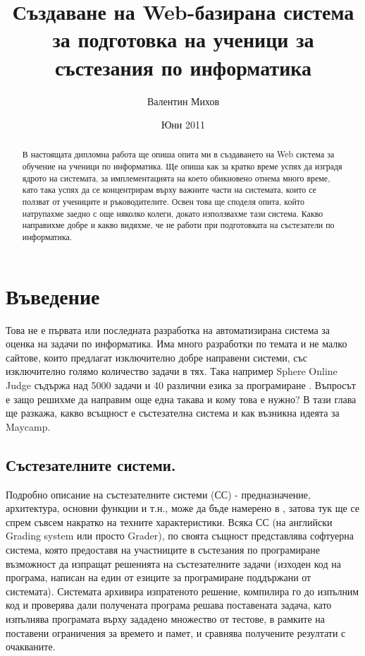 \documentclass[a4paper,12pt]{article}
\begin{document}
  \title{Създаване на Web-базирана система за подготовка на ученици за състезания по информатика}
  \author{Валентин Михов}
  \date{Юни 2011}
  
  \maketitle
  
  \begin{abstract}
    
    В настоящата дипломна работа ще опиша опита ми в създаването на Web система за обучение на ученици по информатика. Ще опиша как за кратко време успях да изградя ядрото на системата, за имплементацията на което обикновено отнема много време, като така успях да се концентрирам върху важните части на системата, които се ползват от учениците и ръководителите. Освен това ще споделя опита, който натрупахме заедно с още няколко колеги, докато използвахме тази система. Какво направихме добре и какво видяхме, че не работи при подготовката на състезатели по информатика.
  \end{abstract}
  
  \newpage

  \tableofcontents
  
  \newpage
  
  \listoffigures
  
  \newpage
  
  \section{Въведение}
    Това не е първата или последната разработка на автоматизирана система за оценка на задачи по информатика. Има много разработки по темата и не малко сайтове, които предлагат изключително добре направени системи, със изключително голямо количество задачи в тях. Така например Sphere Online Judge съдържа над 5000 задачи и 40 различни езика за програмиране \cite{online_judge_list}. Въпросът е защо решихме да направим още една такава и кому това е нужно? В тази глава ще разкажа, какво всъщност е състезателна система и как възникна идеята за Maycamp.
    
    \subsection{Състезателните системи.} Подробно описание на състезателните системи (СС) - предназначение, архитектура, основни функции и т.н., може да бъде намерено в \cite{grading_sys_manev}, затова тук ще се спрем съвсем накратко на техните характеристики. Всяка СС (на английски Grading system или просто Grader), по своята същност представлява софтуерна система, която предоставя на участниците в състезания по програмиране възможност да изпращат решенията на състезателните задачи (изходен код на програма, написан на един от езиците за програмиране поддържани от системата). Системата архивира изпратеното решение, компилира го до изпълним код и проверява дали получената програма решава поставената задача, като изпълнява програмата върху зададено множество от тестове, в рамките на поставени ограничения за времето и памет, и сравнява получените резултати с очакваните. 
\end{document}
